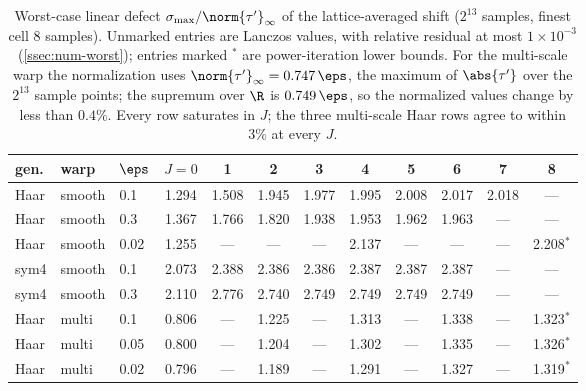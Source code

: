 \begin{table}[h]\centering\small\setlength{\tabcolsep}{4pt}
\begin{tabular}{lllccccccccc}\toprule
gen. & warp & $\eps$ & $J=0$ & 1 & 2 & 3 & 4 & 5 & 6 & 7 & 8\\\midrule
Haar & smooth & 0.1 & 1.294 & 1.508 & 1.945 & 1.977 & 1.995 & 2.008 & 2.017 & 2.018 & ---\\
Haar & smooth & 0.3 & 1.367 & 1.766 & 1.820 & 1.938 & 1.953 & 1.962 & 1.963 & --- & ---\\
Haar & smooth & 0.02 & 1.255 & --- & --- & --- & 2.137 & --- & --- & --- & 2.208$^\ast$\\
\addlinespace[2pt]
sym4 & smooth & 0.1 & 2.073 & 2.388 & 2.386 & 2.386 & 2.387 & 2.387 & 2.387 & --- & ---\\
sym4 & smooth & 0.3 & 2.110 & 2.776 & 2.740 & 2.749 & 2.749 & 2.749 & 2.749 & --- & ---\\
\addlinespace[2pt]
Haar & multi & 0.1 & 0.806 & --- & 1.225 & --- & 1.313 & --- & 1.338 & --- & 1.323$^\ast$\\
Haar & multi & 0.05 & 0.800 & --- & 1.204 & --- & 1.302 & --- & 1.335 & --- & 1.326$^\ast$\\
Haar & multi & 0.02 & 0.796 & --- & 1.189 & --- & 1.291 & --- & 1.327 & --- & 1.319$^\ast$\\
\bottomrule\end{tabular}
\caption{Worst-case linear defect $\sigma_{\max}/\norm{\tau^\prime}_\infty$ of the lattice-averaged shift ($2^{13}$ samples, finest cell 8 samples). Unmarked entries are Lanczos values, with relative residual at most $1\times10^{-3}$ (\cref{ssec:num-worst}); entries marked ${}^\ast$ are power-iteration lower bounds. For the multi-scale warp the normalization uses $\norm{\tau^\prime}_\infty=0.747\,\eps$, the maximum of $\abs{\tau^\prime}$ over the $2^{13}$ sample points; the supremum over $\R$ is $0.749\,\eps$, so the normalized values change by less than $0.4\%$. Every row saturates in $J$; the three multi-scale Haar rows agree to within $3\%$ at every $J$.}\label{tab:worst}
\end{table}
